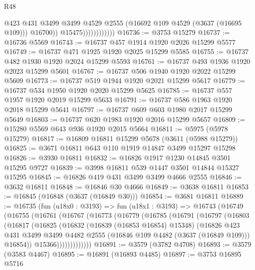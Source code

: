 \begin{lexlean}{R48}
\begin{coremodule}
                                @423
                                @431
                                @3499
                                @3499
                                @4529
                                @2555
                                (@16692 @109 @4529 (@3637 (@16695 @109)))
                                @16700))
                            @15475))))))))))))
@16736 := @3753 @15279
@16737 := @16736 @5569
@16743 := @16737 @457 @1914 @1920 @2026 @15299 @5577
@16749 := @16737 @471 @1925 @1920 @2025 @15299 @5585
@16755 := @16737 @482 @1930 @1920 @2024 @15299 @5593
@16761 := @16737 @493 @1936 @1920 @2023 @15299 @5601
@16767 := @16737 @506 @1940 @1920 @2022 @15299 @5609
@16773 := @16737 @519 @1944 @1920 @2021 @15299 @5617
@16779 := @16737 @534 @1950 @1920 @2020 @15299 @5625
@16785 := @16737 @557 @1957 @1920 @2019 @15299 @5633
@16791 := @16737 @586 @1963 @1920 @2018 @15299 @5641
@16797 := @16737 @609 @603 @1980 @2017 @15299 @5649
@16803 := @16737 @620 @1983 @1920 @2016 @15299 @5657
@16809 := @15280 @5569 @643 @936 @1920 @2015 @5664
@16811 := @5975 (@5978 @15279)
@16817 := @16809 @16811 @15299 @5678 (@3611 (@5988 @15279))
@16825 := @3671 @16811 @643 @110 @1919 @14847 @3499 @15297 @15298
@16826 := @3930 @16811
@16832 := @16826 @1917 @1230 @14845 @3501 @15295 @9727
@16839 := @3998 @16811 @539 @1447 @3501 @14844 @15327 @15295
@16845 := @16826 @419 @431 @3499 @3499 @4666 @2555
@16846 := @3632 @16811
@16848 := @16846 @30 @4666
@16849 := @3638 @16811
@16853 := @16845 (@16848 (@3637 (@16849 @30)))
@16854 := @3681 @16811
@16889 := @16735
    (fun (u18x0 : @3193) =>
    fun (u18x1 : @3193) =>
    @16743
      (@16749
        (@16755
          (@16761
            (@16767
              (@16773
                (@16779
                  (@16785
                    (@16791
                      (@16797
                        (@16803
                          (@16817
                            (@16825
                              (@16832
                                (@16839 (@16853 @16854) @15348)
                                (@16826
                                  @423
                                  @431
                                  @3499
                                  @3499
                                  @4482
                                  @2555
                                  (@16846 @109 @4482 (@3637 (@16849 @109)))
                                  @16854))
                              @15366)))))))))))))
@16891 := @3579 (@3782 @4708)
@16893 := @3579 (@3583 @4467)
@16895 := @16891 (@16893 @4485)
@16897 := @3753 @16895 @5716

\end{coremodule}
\end{lexlean}
